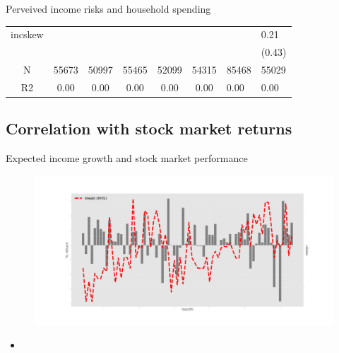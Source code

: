 \documentclass{beamer}
\begin{document}
\begin{frame}{Perveived income risks and household spending}
\begin{table}
{\begin{tabular}{ccccccll}
		incskew   &            &             &              &               &                &                 &             0.21 \\
		&            &             &              &               &                &                 &           (0.43) \\
		\hline 
		N         &      55673 &       50997 &        55465 &         52099 &          54315 &           85468 &            55029 \\
		R2        &       0.00 &        0.00 &         0.00 &          0.00 &           0.00 &            0.00 &             0.00 \\
		\hline 
	\end{tabular}
		}
	\end{table}
\end{frame}


\subsection{Correlation with stock market returns}

\begin{frame}{Expected income growth and stock market performance}
		\begin{figure}
		\centering
		\label{ts_mean}
		\includegraphics[width=\textwidth]{figures/tsMedmean.jpg}
	\end{figure}
	\begin{itemize}
		\item 
	\end{itemize}
\end{frame}
\end{document}
